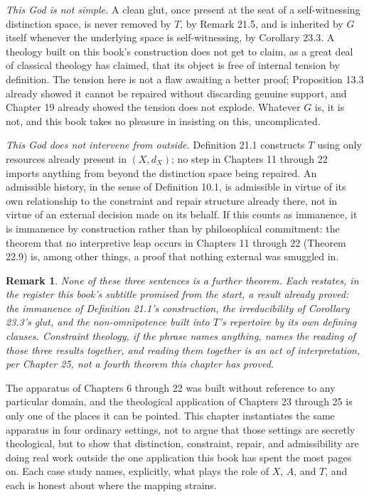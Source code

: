 \documentclass[11pt]{book}
\newtheorem*{appendixremark}{Remark}
\begin{document}
\emph{This God is not simple.} A clean glut, once present at the seat of a self-witnessing distinction space, is never removed by $T$, by Remark 21.5, and is inherited by $G$ itself whenever the underlying space is self-witnessing, by Corollary 23.3. A theology built on this book's construction does not get to claim, as a great deal of classical theology has claimed, that its object is free of internal tension by definition. The tension here is not a flaw awaiting a better proof; Proposition 13.3 already showed it cannot be repaired without discarding genuine support, and Chapter 19 already showed the tension does not explode. Whatever $G$ is, it is not, and this book takes no pleasure in insisting on this, uncomplicated.

\emph{This God does not intervene from outside.} Definition 21.1 constructs $T$ using only resources already present in $(X, d_X)$; no step in Chapters 11 through 22 imports anything from beyond the distinction space being repaired. An admissible history, in the sense of Definition 10.1, is admissible in virtue of its own relationship to the constraint and repair structure already there, not in virtue of an external decision made on its behalf. If this counts as immanence, it is immanence by construction rather than by philosophical commitment: the theorem that no interpretive leap occurs in Chapters 11 through 22 (Theorem 22.9) is, among other things, a proof that nothing external was smuggled in.

\begin{appendixremark}
None of these three sentences is a further theorem. Each restates, in the register this book's subtitle promised from the start, a result already proved: the immanence of Definition 21.1's construction, the irreducibility of Corollary 23.3's glut, and the non-omnipotence built into $T$'s repertoire by its own defining clauses. Constraint theology, if the phrase names anything, names the reading of those three results together, and reading them together is an act of interpretation, per Chapter 25, not a fourth theorem this chapter has proved.
\end{appendixremark}

The apparatus of Chapters 6 through 22 was built without reference to any particular domain, and the theological application of Chapters 23 through 25 is only one of the places it can be pointed. This chapter instantiates the same apparatus in four ordinary settings, not to argue that those settings are secretly theological, but to show that distinction, constraint, repair, and admissibility are doing real work outside the one application this book has spent the most pages on. Each case study names, explicitly, what plays the role of $X$, $A$, and $T$, and each is honest about where the mapping strains.
\end{document}
